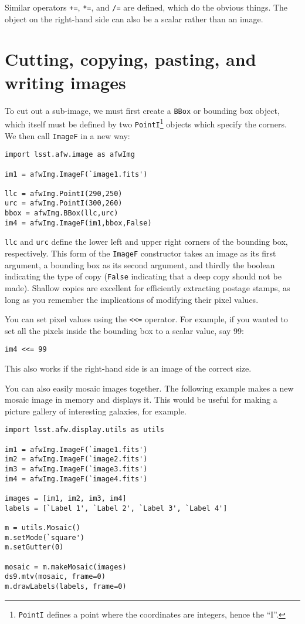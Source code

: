 \documentclass{book}
\begin{document}
Similar operators \texttt{+=}, \texttt{*=}, and \texttt{/=} are
defined, which do the obvious things.  The object on the right-hand
side can also be a scalar rather than an image.

\section{Cutting, copying, pasting, and writing images}

To cut out a sub-image, we must first create a \texttt{BBox} or
bounding box object, which itself must be defined by two
\texttt{PointI}\footnote{\texttt{PointI} defines a point where the
 coordinates are integers, hence the ``I''.}  objects which specify
the corners.  We then call \texttt{ImageF} in a new way:

\begin{verbatim}
import lsst.afw.image as afwImg

im1 = afwImg.ImageF(`image1.fits')

llc = afwImg.PointI(290,250)
urc = afwImg.PointI(300,260)
bbox = afwImg.BBox(llc,urc)
im4 = afwImg.ImageF(im1,bbox,False)
\end{verbatim}

\texttt{llc} and \texttt{urc} define the lower left and upper right
corners of the bounding box, respectively.  This form of the
\texttt{ImageF} constructor takes an image as its first argument, a
bounding box as its second argument, and thirdly the boolean
indicating the type of copy (\texttt{False} indicating that a deep
copy should not be made).  Shallow copies are excellent for
efficiently extracting postage stamps, as long as you remember the
implications of modifying their pixel values.

You can set pixel values using the \texttt{<<=} operator.  For
example, if you wanted to set all the pixels inside the bounding box to a
scalar value, say 99:

\begin{verbatim}
im4 <<= 99
\end{verbatim}

This also works if the right-hand side is an image of the correct size.

You can also easily mosaic images together.  The following example
makes a new mosaic image in memory and displays it.  This would be
useful for making a picture gallery of interesting galaxies, for
example.

\begin{verbatim}
import lsst.afw.display.utils as utils

im1 = afwImg.ImageF(`image1.fits')
im2 = afwImg.ImageF(`image2.fits')
im3 = afwImg.ImageF(`image3.fits')
im4 = afwImg.ImageF(`image4.fits')

images = [im1, im2, im3, im4]
labels = [`Label 1', `Label 2', `Label 3', `Label 4']

m = utils.Mosaic()
m.setMode(`square')
m.setGutter(0)

mosaic = m.makeMosaic(images)
ds9.mtv(mosaic, frame=0)
m.drawLabels(labels, frame=0)
\end{verbatim}
\end{document}
